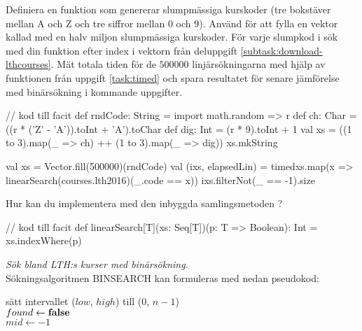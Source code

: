 \Subtask \label{subtask:linsearch-rndCode} Definiera en funktion  som genererar slumpmässiga kurskoder (tre bokstäver mellan A och Z och tre siffror mellan 0 och 9). Använd  för att fylla en vektor kallad  med en halv miljon slumpmässiga kurskoder. För varje slumpkod i  sök med din funktion  efter index i vektorn  från deluppgift \ref{subtask:download-lthcourses}. Mät totala tiden för de $500000$ linjärsökningarna med hjälp av funktionen  från uppgift \ref{task:timed} och spara resultatet för senare jämförelse med binärsökning i kommande uppgifter.

 

\begin{Code}
// kod till facit
def rndCode: String = {
  import math.{random => r}
  def ch: Char = ((r * ('Z' - 'A')).toInt + 'A').toChar
  def dig: Int   = (r * 9).toInt + 1
  val xs = ((1 to 3).map(_ => ch) ++ (1 to 3).map(_ => dig))
  xs.mkString
}

val xs = Vector.fill(500000)(rndCode)
val (ixs, elapsedLin) = 
  timed{xs.map(x => linearSearch(courses.lth2016)(_.code == x))}
ixs.filterNot(_ == -1).size
\end{Code}



\Subtask\Pen Hur kan du implementera  med den inbyggda samlingsmetoden ?

\begin{Code}
// kod till facit
def linearSearch[T](xs: Seq[T])(p: T => Boolean): Int = 
  xs.indexWhere(p)
\end{Code}



\Task \emph{Sök bland LTH:s kurser med binärsökning.} \\Sökningsalgoritmen BINSEARCH kan formuleras med nedan pseudokod:

\begin{algorithm}[H]

 sätt intervallet ($low$, $high$) till ($0$, $n - 1$) \\
 $found \leftarrow \bf{false}$ \\
 $mid \leftarrow -1$\\
\end{algorithm}

